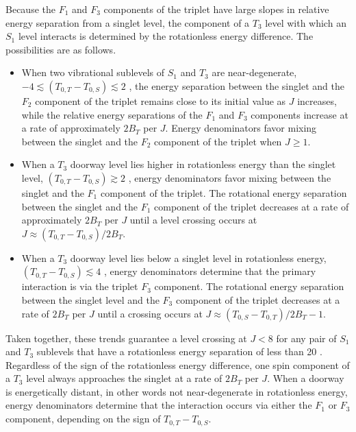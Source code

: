 \documentclass[12pt]{mitthesis}
\begin{document}
Because the $F_1$ and $F_3$ components of the triplet have large
slopes in relative energy separation from a singlet level, the
component of a $T_3$ level with which an $S_1$ level interacts is
determined by the rotationless energy difference.  The possibilities
are as follows.
\begin{itemize}
\item When two vibrational sublevels of $S_1$ and $T_3$ are
  near-degenerate, $-4 \lesssim (T_{0,T} - T_{0,S}) \lesssim 2$ \rcm,
  the energy separation between the singlet and the $F_2$ component of
  the triplet remains close to its initial value as $J$ increases,
  while the relative energy separations of the $F_1$ and $F_3$
  components increase at a rate of approximately $2B_T$ per $J$.
  Energy denominators favor mixing between the singlet and the $F_2$
  component of the triplet when $J \ge 1$.
\item When a $T_3$ doorway level lies higher in rotationless energy
  than the singlet level, $ (T_{0,T} - T_{0,S}) \gtrsim 2$ \rcm,
  energy denominators favor mixing between the singlet and the $F_1$
  component of the triplet.  The rotational energy separation between
  the singlet and the $F_1$ component of the triplet decreases at a
  rate of approximately $2B_T$ per $J$ until a level crossing occurs
  at $J \approx (T_{0,T} - T_{0,S}) / 2 B_T$.
\item When a $T_3$ doorway level lies below a singlet level in
  rotationless energy, $(T_{0,T} - T_{0,S}) \lesssim 4$ \rcm, energy
  denominators determine that the primary interaction is via the
  triplet $F_3$ component.  The rotational energy separation between
  the singlet level and the $F_3$ component of the triplet decreases
  at a rate of $2B_T$ per $J$ until a crossing occurs at $J \approx
  (T_{0,S} - T_{0,T}) / 2 B_T - 1$.
\end{itemize}
Taken together, these trends guarantee a level crossing at $J<8$ for
any pair of $S_1$ and $T_3$ sublevels that have a rotationless energy
separation of less than 20 \rcm.  Regardless of the sign of the
rotationless energy difference, one spin component of a $T_3$ level
always approaches the singlet at a rate of $2B_T$ per $J$.  When a
doorway is energetically distant, in other words not near-degenerate
in rotationless energy, energy denominators determine that the
interaction occurs via either the $F_1$ or $F_3$ component, depending
on the sign of $T_{0,T} - T_{0,S}$.
\end{document}
